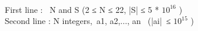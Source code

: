 \\First line :  N and S (2 ≤ N ≤ 22, |S| ≤ 5 * $10^{16}$ )
\\Second line : N integers, a1, a2,..., an  (|ai| ≤ $10^{15}$ )